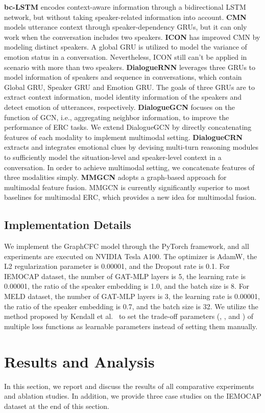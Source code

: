 \documentclass[lettersize,journal]{IEEEtran}
\begin{document}
\textbf{bc-LSTM} encodes context-aware information through a bidirectional LSTM network, but without taking speaker-related information into account. 
\textbf{CMN} models utterance context through speaker-dependency GRUs, but it can only work when the conversation includes two speakers. \textbf{ICON} has improved CMN by modeling distinct speakers. A global GRU is utilized to model the variance of emotion status in a conversation. Nevertheless, ICON still can't be applied in scenario with more than two speakers. \textbf{DialogueRNN} leverages three GRUs to model information of speakers and sequence in conversations, which contain Global GRU, Speaker GRU and Emotion GRU. The goals of three GRUs are to extract context information, model identity information of the speakers and detect emotion of utterances, respectively. \textbf{DialogueGCN} focuses on the function of GCN, i.e., aggregating neighbor information, to improve the performance of ERC tasks. We extend DialogueGCN by directly concatenating features of each modality to implement multimodal setting. \textbf{DialogueCRN} extracts and integrates emotional clues by devising multi-turn reasoning modules to sufficiently model the situation-level and speaker-level context in a conversation. In order to achieve multimodal setting, we concatenate features of three modalities simply. \textbf{MMGCN} adopts a graph-based approach for multimodal feature fusion. MMGCN is currently significantly superior to most baselines for multimodal ERC, which provides a new idea for multimodal fusion.

\subsection{Implementation Details}
We implement the GraphCFC model through the PyTorch framework, and all experiments are executed on NVIDIA Tesla A100. The optimizer is AdamW, the L2 regularization parameter is 0.00001, and the Dropout rate is 0.1. For IEMOCAP dataset, the number of GAT-MLP layers is 5, the learning rate is 0.00001, the ratio of the speaker embedding  is 1.0, and the batch size is 8. For MELD dataset, the number of GAT-MLP layers is 3, the learning rate is 0.00001, the ratio of the speaker embedding  is 0.7, and the batch size is 32. We utilize the method proposed by Kendall et al.~\cite{kendall2018multi} to set the trade-off parameters (, ,  and ) of multiple loss functions as learnable parameters instead of setting them manually.

\section{Results and Analysis}\label{sec:results_analysis}
In this section, we report and discuss the results of all comparative experiments and ablation studies. In addition, we provide three case studies on the IEMOCAP dataset at the end of this section.
\end{document}
